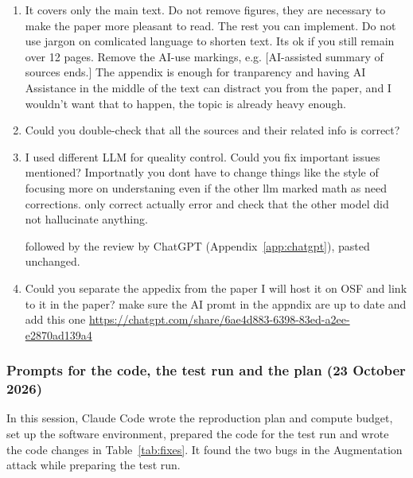\documentclass[a4paper]{article}
\newcommand{\prompt}[1]{{\raggedright\small\ttfamily\frenchspacing #1\par}}
\begin{document}
\begin{enumerate}
  \item \prompt{It covers only the main text. Do not remove figures, they are necessary to make the paper more pleasant to read. The rest you can implement. Do not use jargon on comlicated language to shorten text. Its ok if you still remain over 12 pages. Remove the AI-use markings, e.g. \textquotedbl{}[AI-assisted summary of sources ends.]\textquotedbl{} The appendix is enough for tranparency and having \textquotedbl{}AI Assistance\textquotedbl{} in the middle of the text can distract you from the paper, and I wouldn't want that to happen, the topic is already heavy enough.}
  \item \prompt{Could you double-check that all the sources and their related info is correct?}
  \item \prompt{I used  different LLM for queality control. Could you fix important issues mentioned? Importnatly you dont have to change things like the style of focusing more on understaning even if the other llm marked math as \textquotedbl{}need corrections\textquotedbl{}. only correct actually error and check that the other model did not hallucinate anything.}
  followed by the review by ChatGPT (Appendix~\ref{app:chatgpt}), pasted unchanged.
  \item \prompt{Could you separate the appedix from the paper I will host it on OSF and link to it in the paper? make sure the AI promt in the appndix are up to date and add this one \url{https://chatgpt.com/share/6ae4d883-6398-83ed-a2ee-e2870ad139a4}}
\end{enumerate}

\subsubsection{Prompts for the code, the test run and the plan (23 October 2026)}
\label{app:prompts-code}
In this session, Claude Code wrote the reproduction plan and compute budget, set up the software environment, prepared the code for the test run and wrote the code changes in Table~\ref{tab:fixes}. It found the two bugs in the Augmentation attack while preparing the test run.
\end{document}
